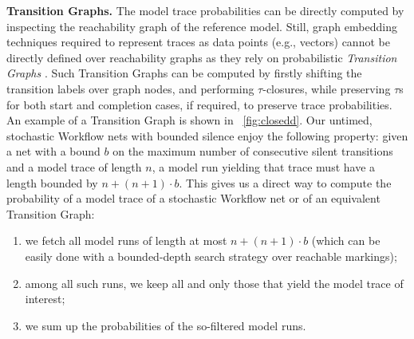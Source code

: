 \medskip
\noindent
\textbf{Transition Graphs.} The model trace probabilities can be directly computed by inspecting the reachability graph of the reference model. Still, graph embedding techniques required to represent traces as data points (e.g., vectors)
cannot be directly defined over reachability graphs as they %
rely on probabilistic \emph{Transition Graphs} \cite{GartnerFW03}. Such Transition Graphs can be computed by firstly shifting the transition labels over graph nodes, and performing $\tau$-closures, while preserving $\tau$s for both start and completion cases, if required, to preserve trace probabilities. An example of a Transition Graph is shown in \figurename~\ref{fig:closedd}. 
Our untimed, stochastic Workflow nets with bounded silence enjoy the following property: given a net with a bound $b$ on the maximum number of consecutive silent transitions and a model trace of length $n$, a model run yielding that trace must have a length bounded by $n+(n+1)\cdot b$.
This gives us a direct way to compute the probability of a model trace of a stochastic Workflow net or of an equivalent Transition Graph:
\begin{enumerate}
	\item  we fetch all model runs of length at most $n+(n+1)\cdot b$ (which can be easily done with a bounded-depth search strategy over reachable markings);
	\item among all such runs, we keep all and only those that yield the model trace of interest;
	\item we sum up the probabilities of the so-filtered model runs.
\end{enumerate}



